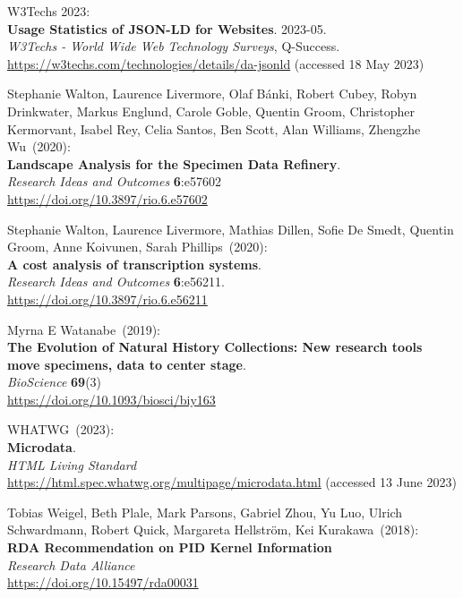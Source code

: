 \begin{thebibliography}{9}
W3Techs 2023: \\
\textbf{Usage Statistics of JSON-LD for Websites}. 2023-05. \\
\emph{W3Techs - World Wide Web Technology Surveys}, Q-Success.\\
\url{https://w3techs.com/technologies/details/da-jsonld} (accessed 18
May 2023)

Stephanie Walton, Laurence Livermore, Olaf Bánki, Robert Cubey, Robyn Drinkwater, Markus Englund, Carole Goble, Quentin Groom, Christopher Kermorvant, Isabel Rey, Celia Santos, Ben Scott, Alan Williams, Zhengzhe Wu~(2020): \\
\textbf{Landscape Analysis for the Specimen Data Refinery}.\\
\emph{Research Ideas and Outcomes} \textbf{6}:e57602\\
\url{https://doi.org/10.3897/rio.6.e57602}

Stephanie Walton, Laurence Livermore, Mathias Dillen, Sofie De Smedt, Quentin Groom, Anne Koivunen, Sarah Phillips~(2020): \\
\textbf{A cost analysis of transcription systems}. \\
\emph{Research Ideas and Outcomes} \textbf{6}:e56211.\\
\url{https://doi.org/10.3897/rio.6.e56211}

Myrna E Watanabe~(2019): \\
\textbf{The Evolution of Natural History Collections: New research tools move specimens, data to center stage}.\\
\emph{BioScience} \textbf{69}(3)\\
\url{https://doi.org/10.1093/biosci/biy163}

WHATWG~(2023): \\
\textbf{Microdata}. \\
\emph{{HTML Living Standard}}\\
\url{https://html.spec.whatwg.org/multipage/microdata.html} (accessed 13
June 2023)

Tobias Weigel, Beth Plale, Mark Parsons, Gabriel Zhou, Yu Luo, Ulrich Schwardmann, Robert Quick, Margareta Hellström, Kei Kurakawa~(2018): \\
\textbf{{RDA Recommendation} on {PID Kernel Information}} \\
\emph{Research Data Alliance}\\
\url{https://doi.org/10.15497/rda00031}


\end{thebibliography}
